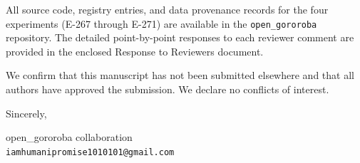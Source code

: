 \documentclass[12pt]{article}
\begin{document}
All source code, registry entries, and data provenance records for the
four experiments (E-267 through E-271) are available in the
\texttt{open\_gororoba} repository.
The detailed point-by-point responses to each reviewer comment are
provided in the enclosed Response to Reviewers document.

We confirm that this manuscript has not been submitted elsewhere and that
all authors have approved the submission.
We declare no conflicts of interest.

\vspace{1.5em}
\noindent
Sincerely,

\vspace{2em}
\noindent
open\_gororoba collaboration\\
\texttt{iamhumanipromise1010101@gmail.com}
\end{document}

